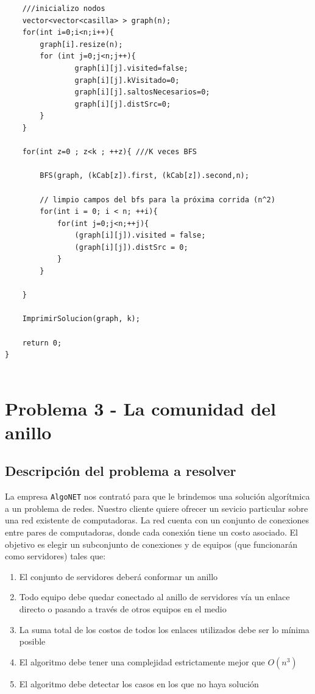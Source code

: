 \documentclass[11pt, a4paper, twoside]{article}
\begin{document}
\begin{verbatim}
	///inicializo nodos
	vector<vector<casilla> > graph(n);
	for(int i=0;i<n;i++){
		graph[i].resize(n);
		for (int j=0;j<n;j++){
                graph[i][j].visited=false;
                graph[i][j].kVisitado=0;
                graph[i][j].saltosNecesarios=0;
                graph[i][j].distSrc=0;
		}
    }

	for(int z=0 ; z<k ; ++z){ ///K veces BFS

		BFS(graph, (kCab[z]).first, (kCab[z]).second,n);

		// limpio campos del bfs para la próxima corrida (n^2)
		for(int i = 0; i < n; ++i){
			for(int j=0;j<n;++j){
				(graph[i][j]).visited = false;
				(graph[i][j]).distSrc = 0;
			}
		}

    }

	ImprimirSolucion(graph, k);

    return 0;
}


\end{verbatim}

\clearpage
\section{Problema 3 - La comunidad del anillo}

\subsection{Descripción del problema a resolver}
La empresa \texttt{AlgoNET} nos contrató para que le brindemos una 
solución algorítmica a un problema de redes. Nuestro cliente quiere ofrecer
un sevicio particular sobre una red existente de computadoras. La red cuenta
con un conjunto de conexiones entre pares de computadoras, donde cada 
conexión tiene un costo asociado. El objetivo es elegir un subconjunto de 
conexiones y de equipos (que funcionarán como servidores) tales que:
\begin{enumerate}
  \item El conjunto de servidores deberá conformar un anillo
  \item Todo equipo debe quedar conectado al anillo de servidores vía un 
        enlace directo o pasando a través de otros equipos en el medio
  \item La suma total de los costos de todos los enlaces utilizados debe
        ser lo mínima posible
  \item El algoritmo debe tener una complejidad estrictamente mejor que $O(n^3)$
  \item El algoritmo debe detectar los casos en los que no haya solución
\end{enumerate}
\end{document}

